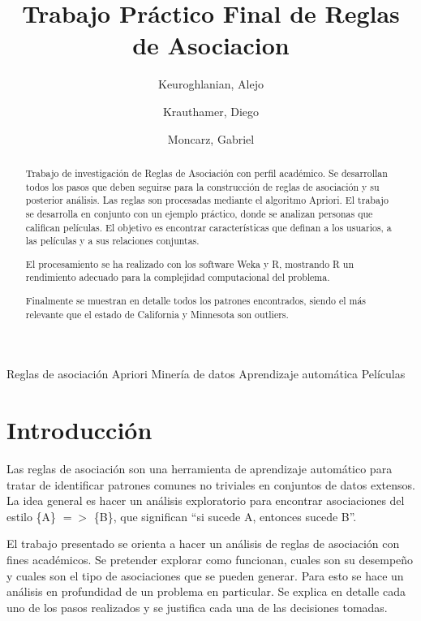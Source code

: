 \documentclass[journal]{IEEEtran}
\begin{document}
\title{Trabajo Práctico Final de Reglas de Asociacion}
\author{
	Keuroghlanian, Alejo \\
	\and
	Krauthamer, Diego \\
	\and
	Moncarz, Gabriel}
\maketitle %

\begin{abstract}
Trabajo de investigación de Reglas de Asociación con perfil académico. Se desarrollan
todos los pasos que deben seguirse para la construcción de reglas de asociación
y su posterior análisis. Las reglas son procesadas mediante el algoritmo Apriori.
El trabajo se desarrolla en conjunto con  un ejemplo
práctico, donde se analizan personas que califican películas. El objetivo es encontrar 
características que definan a los usuarios, a las películas y a sus
relaciones conjuntas. 

El procesamiento se ha realizado con los software
Weka y R, mostrando R un rendimiento
adecuado para la complejidad computacional del problema.

Finalmente se muestran en detalle todos los patrones encontrados, siendo el más 
relevante que el estado de California y Minnesota son outliers.
\end{abstract}

\begin{IEEEkeywords}
Reglas de asociación
Apriori
Minería de datos
Aprendizaje automática
Películas
\end{IEEEkeywords}







\section{Introducción}

Las reglas de asociación son una herramienta de aprendizaje automático para
tratar de identificar patrones comunes no triviales en conjuntos de datos
extensos. La idea general es hacer un análisis exploratorio para  encontrar 
asociaciones del estilo \{A\} $=$$>$ \{B\}, que significan 
``si sucede A, entonces sucede B''. 

El trabajo presentado se orienta a hacer un análisis de reglas de asociación con
fines académicos. Se pretender explorar como funcionan, cuales son  su desempeño y
cuales son el tipo de asociaciones que se pueden generar. Para esto se
hace un análisis en profundidad de un problema en particular. Se
explica en detalle cada uno de los pasos realizados y se justifica cada una de 
las decisiones tomadas.
\end{document}
